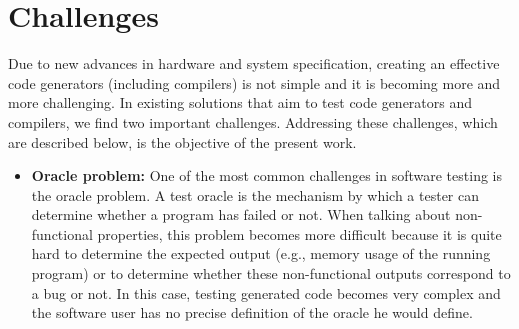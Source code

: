 \section{Challenges}
Due to new advances in hardware and system specification, creating an effective code generators (including compilers) is not simple and it is becoming more and more challenging.
In existing solutions that aim to test code generators and compilers, we find two important challenges. Addressing these challenges, which are described below, is the objective of the present work.
\begin{itemize}
\item
\textbf{Oracle problem:} One of the most common challenges in software testing is the oracle problem. A test oracle is the mechanism by which a tester can determine whether a program has failed or not. When talking about non-functional properties, this problem becomes more difficult because it is quite hard to determine the expected output (e.g., memory usage of the running program) or to determine whether these non-functional outputs correspond to a bug or not. In this case, testing generated code becomes very complex and the software user has no precise definition of the oracle he would define.



\end{itemize}
